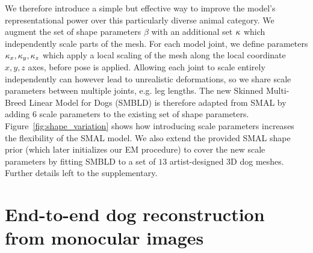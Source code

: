We therefore introduce a simple but effective way to improve the model's representational power over this particularly diverse  animal category. We augment the set of shape parameters $\beta$ with an additional set $\kappa$ which independently scale parts of the mesh. For each model joint, we define parameters ${\kappa_x,\kappa_y,\kappa_z}$ which apply a local scaling of the mesh along the local coordinate $x, y, z$ axes, before pose is applied. Allowing each joint to scale entirely independently can however lead to unrealistic deformations, so we share scale parameters between multiple joints, e.g. leg lengths. The new Skinned Multi-Breed Linear Model for Dogs (SMBLD) is therefore adapted from SMAL by adding $6$ scale parameters to the existing set of shape parameters. Figure~\ref{fig:shape_variation} shows how introducing scale parameters increases the flexibility of the SMAL model. We also extend the provided SMAL shape prior (which later initializes our EM procedure) to cover the new scale parameters by fitting SMBLD to a set of $13$ artist-designed 3D dog meshes. Further details left to the supplementary.







\section{End-to-end dog reconstruction from monocular images} 

